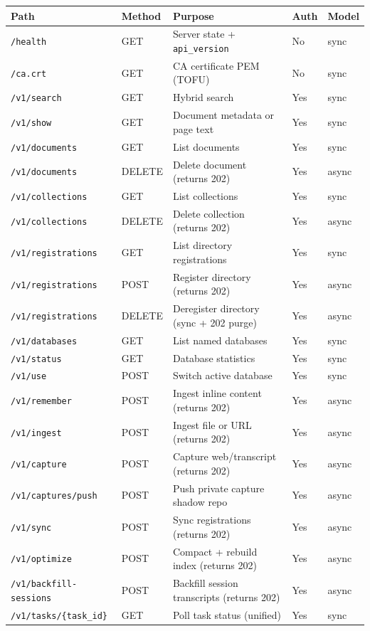 \documentclass[a4paper,10pt]{article}
\newcommand{\field}[1]{\texttt{#1}}
\begin{document}
\begin{center}
\begin{tabular}{llp{5.3cm}ll}
\toprule
\textbf{Path} & \textbf{Method} & \textbf{Purpose} &
  \textbf{Auth} & \textbf{Model} \\
\midrule
\texttt{/health}              & GET    & Server state + \field{api\_version} & No  & sync  \\
\texttt{/ca.crt}              & GET    & CA certificate PEM (TOFU)        & No  & sync  \\
\texttt{/v1/search}           & GET    & Hybrid search                    & Yes & sync  \\
\texttt{/v1/show}             & GET    & Document metadata or page text   & Yes & sync  \\
\texttt{/v1/documents}        & GET    & List documents                   & Yes & sync  \\
\texttt{/v1/documents}        & DELETE & Delete document (returns 202)    & Yes & async \\
\texttt{/v1/collections}      & GET    & List collections                 & Yes & sync  \\
\texttt{/v1/collections}      & DELETE & Delete collection (returns 202)  & Yes & async \\
\texttt{/v1/registrations}    & GET    & List directory registrations     & Yes & sync  \\
\texttt{/v1/registrations}    & POST   & Register directory (returns 202) & Yes & async \\
\texttt{/v1/registrations}    & DELETE & Deregister directory (sync + 202 purge) & Yes & async \\
\texttt{/v1/databases}        & GET    & List named databases             & Yes & sync  \\
\texttt{/v1/status}           & GET    & Database statistics              & Yes & sync  \\
\texttt{/v1/use}              & POST   & Switch active database           & Yes & sync  \\
\texttt{/v1/remember}         & POST   & Ingest inline content (returns 202) & Yes & async \\
\texttt{/v1/ingest}           & POST   & Ingest file or URL (returns 202) & Yes & async \\
\texttt{/v1/capture}          & POST   & Capture web/transcript (returns 202) & Yes & async \\
\texttt{/v1/captures/push}    & POST   & Push private capture shadow repo & Yes & async \\
\texttt{/v1/sync}             & POST   & Sync registrations (returns 202) & Yes & async \\
\texttt{/v1/optimize}         & POST   & Compact + rebuild index (returns 202) & Yes & async \\
\texttt{/v1/backfill-sessions}& POST   & Backfill session transcripts (returns 202) & Yes & async \\
\texttt{/v1/tasks/\{task\_id\}} & GET  & Poll task status (unified)       & Yes & sync  \\
\bottomrule
\end{tabular}
\end{center}
\end{document}
